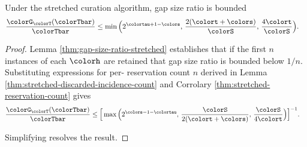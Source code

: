 \begin{theorem}
\label{thm:stretched-gap-size}
Under the stretched curation algorithm, gap size ratio is bounded
\begin{align*}
\frac{\colorG_{\colorT}(\colorTbar)}{\colorTbar}
&\leq
\min\Big(
  2^{\colortau+1-\colors},\,
  \frac{2(\colort + \colors)}{\colorS},\,
  \frac{4\colort}{\colorS}
\Big).
\end{align*}
\end{theorem}
\begin{proof}

Lemma \ref{thm:gap-size-ratio-stretched} establishes that if the first $n$ instances of each \hv{} $\colorh$ are retained that gap size ratio is bounded below $1/n$.
Substituting expressions for per-\hv{} reservation count $n$ derived in Lemma \ref{thm:stretched-discarded-incidence-count} and Corrolary \ref{thm:stretched-reservation-count} gives
\begin{align*}
  \frac{\colorG_{\colorT}(\colorTbar)}{\colorTbar}
  &\leq
  \Big[
    \max\Big(
      2^{\colors - 1 - \colortau},\,
      \frac{\colorS}{2(\colort + \colors)},\,
      \frac{\colorS}{4\colort}
    \Big)
  \Big]^{-1}.
\end{align*}

Simplifying resolves the result.

\end{proof}
